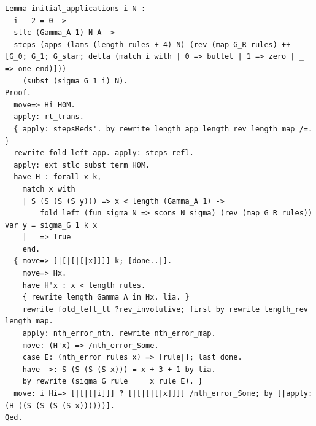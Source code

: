 \documentclass[10pt,a4paper]{amsart}
\begin{document}
\begin{lstlisting}
Lemma initial_applications i N :
  i - 2 = 0 ->
  stlc (Gamma_A 1) N A ->
  steps (apps (lams (length rules + 4) N) (rev (map G_R rules) ++ [G_0; G_1; G_star; delta (match i with | 0 => bullet | 1 => zero | _ => one end)]))
    (subst (sigma_G 1 i) N).
Proof.
  move=> Hi H0M.
  apply: rt_trans.
  { apply: stepsReds'. by rewrite length_app length_rev length_map /=. }
  rewrite fold_left_app. apply: steps_refl.
  apply: ext_stlc_subst_term H0M.
  have H : forall x k,
    match x with
    | S (S (S (S y))) => x < length (Gamma_A 1) ->
        fold_left (fun sigma N => scons N sigma) (rev (map G_R rules)) var y = sigma_G 1 k x
    | _ => True
    end.
  { move=> [|[|[|[|x]]]] k; [done..|].
    move=> Hx.
    have H'x : x < length rules.
    { rewrite length_Gamma_A in Hx. lia. }
    rewrite fold_left_lt ?rev_involutive; first by rewrite length_rev length_map.
    apply: nth_error_nth. rewrite nth_error_map.
    move: (H'x) => /nth_error_Some.
    case E: (nth_error rules x) => [rule|]; last done.
    have ->: S (S (S (S x))) = x + 3 + 1 by lia.
    by rewrite (sigma_G_rule _ _ x rule E). }
  move: i Hi=> [|[|[|i]]] ? [|[|[|[|x]]]] /nth_error_Some; by [|apply: (H ((S (S (S (S x))))))].
Qed.


\end{lstlisting}
\end{document}
